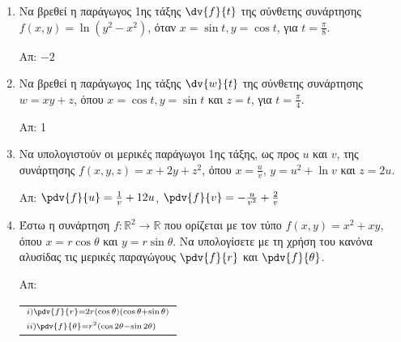 




\pagestyle{vangelis}
\everymath{\displaystyle}



\begin{center}
\end{center}

\vspace{\baselineskip}

\begin{enumerate}




    \section{Απλες}
 
\item Να βρεθεί η παράγωγος 1ης τάξης $\dv{f}{t}$ της σύνθετης συνάρτησης $f(x,y)=\ln(y^2-x^2)$, όταν $x=\sin t, y=\cos t$, για $t=\frac{\pi}{8}$.

\hfill Απ: $\scriptstyle{-2}$

\item Να βρεθεί η παράγωγος 1ης τάξης $\dv{w}{t}$ της σύνθετης συνάρτησης $ w = xy+z $, όπου $ x =
	\cos{t}, y = \sin{t}$ και $ z = t $, για $ t = \frac{ \pi }{ 4 } $.

	\hfill Απ: 1

\item Να υπολογιστούν οι μερικές παράγωγοι 1ης τάξης, ως προς $u$ και $v$, της συνάρτησης $ f(x,y,z)
	= x + 2y + z^{2}$, όπου $ x = \frac{ u }{ v } $, $y = u^{2} + \ln{v} $ και $ z = 2u $.

	\hfill Απ: $ \pdv{f}{u} = \frac{1}{ v } + 12u $, $\pdv{f}{v} = -\frac{ u }{ v^{2} } + \frac{
	2 }{ v } $

 \item Έστω η συνάρτηση $ f : \mathbb{R}^{2} \to \mathbb{R} $ που ορίζεται με τον τύπο $ f(x,y) =
	 x^{2} + xy $, όπου $ x=r \cos{\theta} $ και $ y= r \sin{\theta} $. Να υπολογίσετε με τη χρήση
	 του κανόνα αλυσίδας τις μερικές παραγώγους $ \pdv{f}{r} $ και $ \pdv{f}{\theta} $.

	 \hfill Απ: \begin{tabular}{l}
		 $\scriptstyle{i) \pdv{f}{r} = 2r(\cos{\theta} )(\cos{\theta} + \sin{\theta})}
			 $ \\
			 $\scriptstyle{ii) \pdv{f}{\theta}=r^{2}(\cos{2\theta} - \sin{2 \theta})} $
	 \end{tabular}



\end{enumerate}
